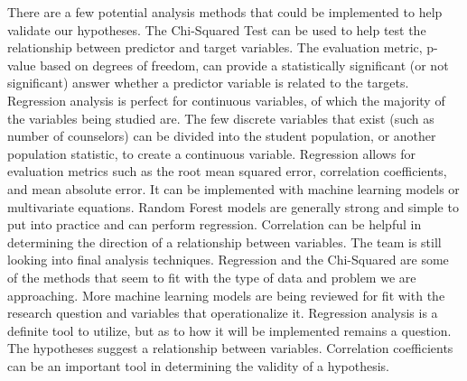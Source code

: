 There are a few potential analysis methods that could be implemented to help validate our hypotheses. The Chi-Squared Test can be used to help test the relationship between predictor and target variables. The evaluation metric, p-value based on degrees of freedom, can provide a statistically significant (or not significant) answer whether a predictor variable is related to the targets. 
Regression analysis is perfect for continuous variables, of which the majority of the variables being studied are. The few discrete variables that exist (such as number of counselors) can be divided into the student population, or another population statistic, to create a continuous variable. 
Regression allows for evaluation metrics such as the root mean squared error, correlation coefficients, and mean absolute error. 
It can be implemented with machine learning models or multivariate equations. 
Random Forest models are generally strong and simple to put into practice and can perform regression. Correlation can be helpful in determining the direction of a relationship between variables. 
The team is still looking into final analysis techniques. 
Regression and the Chi-Squared are some of the methods that seem to fit with the type of data and problem we are approaching. 
More machine learning models are being reviewed for fit with the research question and variables that operationalize it.
Regression analysis is a definite tool to utilize, but as to how it will be implemented remains a question. 
The hypotheses suggest a relationship between variables. 
Correlation coefficients can be an important tool in determining the validity of a hypothesis.